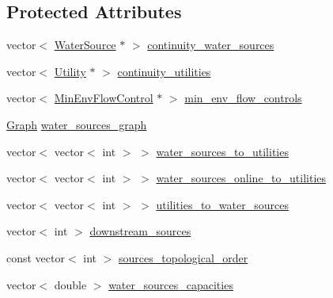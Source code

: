 \subsection*{Protected Attributes}
\begin{DoxyCompactItemize}
\item 
vector$<$ \mbox{\hyperlink{classWaterSource}{Water\+Source}} $\ast$ $>$ \mbox{\hyperlink{classContinuityModel_a3980284a9dd08bae4e76398d1b0d6f55_a3980284a9dd08bae4e76398d1b0d6f55}{continuity\+\_\+water\+\_\+sources}}
\item 
vector$<$ \mbox{\hyperlink{classUtility}{Utility}} $\ast$ $>$ \mbox{\hyperlink{classContinuityModel_adc77a0214d553a961035ce86c93cf9be_adc77a0214d553a961035ce86c93cf9be}{continuity\+\_\+utilities}}
\item 
vector$<$ \mbox{\hyperlink{classMinEnvFlowControl}{Min\+Env\+Flow\+Control}} $\ast$ $>$ \mbox{\hyperlink{classContinuityModel_afc991e5c0d144020e49a97751a04b302_afc991e5c0d144020e49a97751a04b302}{min\+\_\+env\+\_\+flow\+\_\+controls}}
\item 
\mbox{\hyperlink{classGraph}{Graph}} \mbox{\hyperlink{classContinuityModel_a563401588c6fa622f03393909a3522db_a563401588c6fa622f03393909a3522db}{water\+\_\+sources\+\_\+graph}}
\item 
vector$<$ vector$<$ int $>$ $>$ \mbox{\hyperlink{classContinuityModel_ae8516bcbbf52650190277fc8b06c1843_ae8516bcbbf52650190277fc8b06c1843}{water\+\_\+sources\+\_\+to\+\_\+utilities}}
\item 
vector$<$ vector$<$ int $>$ $>$ \mbox{\hyperlink{classContinuityModel_a6d80a7e50e022e2cdb5e912d5b3b5cf0_a6d80a7e50e022e2cdb5e912d5b3b5cf0}{water\+\_\+sources\+\_\+online\+\_\+to\+\_\+utilities}}
\item 
vector$<$ vector$<$ int $>$ $>$ \mbox{\hyperlink{classContinuityModel_a5cf4be0afa886eb09a3e143f54c29044_a5cf4be0afa886eb09a3e143f54c29044}{utilities\+\_\+to\+\_\+water\+\_\+sources}}
\item 
vector$<$ int $>$ \mbox{\hyperlink{classContinuityModel_af00ea62ac8e2e398591ff608c2a203ef_af00ea62ac8e2e398591ff608c2a203ef}{downstream\+\_\+sources}}
\item 
const vector$<$ int $>$ \mbox{\hyperlink{classContinuityModel_a6605cb6aae0370eb84d2e8bf7d6d651e_a6605cb6aae0370eb84d2e8bf7d6d651e}{sources\+\_\+topological\+\_\+order}}
\item 
vector$<$ double $>$ \mbox{\hyperlink{classContinuityModel_aadc8d46b2d0cc0a5c6b5ccdf0c5c24d4_aadc8d46b2d0cc0a5c6b5ccdf0c5c24d4}{water\+\_\+sources\+\_\+capacities}}

\end{DoxyCompactItemize}

